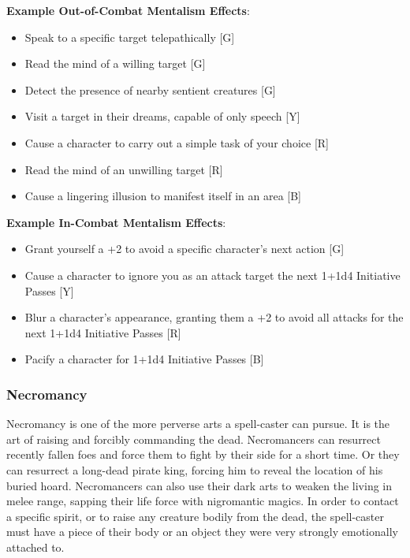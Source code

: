 \documentclass[oneside]{book}
\begin{document}
\begin{multicols}{2}
\textbf{Example Out-of-Combat Mentalism Effects}:
	\begin{itemize}
		\setlength{\itemsep}{0cm}%
  		\setlength{\parskip}{0cm}%
		\item{ \small Speak to a specific target telepathically [G]}
		\item{ \small Read the mind of a willing target [G]}
		\item{ \small Detect the presence of nearby sentient creatures [G]}
		\item{ \small Visit a target in their dreams, capable of only speech [Y]}
		\item{ \small Cause a character to carry out a simple task of your choice [R]}
		\item{ \small Read the mind of an unwilling target [R]}
		\item{ \small Cause a lingering illusion to manifest itself in an area [B]}
	\end{itemize}
	
\textbf{Example In-Combat Mentalism Effects}:
	\begin{itemize}
		\setlength{\itemsep}{0cm}%
  		\setlength{\parskip}{0cm}%
		\item{ \small Grant yourself a +2 to avoid a specific character's next action [G]}
		\item{ \small Cause a character to ignore you as an attack target the next 1+1d4 Initiative Passes [Y]}
		\item{ \small Blur a character's appearance, granting them a +2 to avoid all attacks for the next 1+1d4 Initiative Passes [R]}
		\item{ \small Pacify a character for 1+1d4 Initiative Passes [B]}
	\end{itemize}
	
	
\subsubsection{Necromancy}
Necromancy is one of the more perverse arts a spell-caster can pursue. It is the art of raising and forcibly commanding the dead. Necromancers can resurrect recently fallen foes and force them to fight by their side for a short time. Or they can resurrect a long-dead pirate king, forcing him to reveal the location of his buried hoard. Necromancers can also use their dark arts to weaken the living in melee range, sapping their life force with nigromantic magics. In order to contact a specific spirit, or to raise any creature bodily from the dead, the spell-caster must have a piece of their body or an object they were very strongly emotionally attached to.


\end{multicols}
\end{document}
